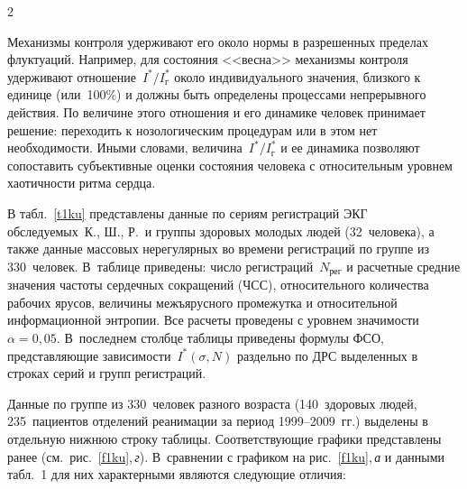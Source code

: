 \begin{multicols}{2}
Механизмы контроля удерживают его 
около нормы в разрешенных пределах флуктуаций. Например, для состояния 
<<весна>> механизмы контроля удерживают отношение~$I^*/I_{\mathrm{г}}^*$ 
около индивидуального значения, близкого к единице (или~100\%) и должны 
быть определены процессами непрерывного действия. По величине этого 
отношения и его динамике человек принимает решение: переходить к 
нозологическим процедурам или в этом нет необходимости. Иными словами, 
величина~$I^*/I_{\mathrm{г}}^*$ и ее динамика позволяют сопоставить 
субъективные оценки состояния человека с относительным уровнем 
хаотичности ритма сердца.
  
  В табл.~\ref{t1ku} представлены данные по сериям регистраций ЭКГ 
обследуемых~К., Ш., Р.\ и группы здоровых молодых людей (32~человека), а 
также данные массовых нерегулярных во времени ре\-гист\-ра\-ций по группе из 
330~человек. В~таблице приведены: число регистраций~$N_{\mathrm{рег}}$ и 
расчетные средние значения частоты сердечных сокращений (ЧСС), 
относительного количества рабочих ярусов, величины межъярусного 
промежутка и относительной информационной энтропии. Все расчеты 
проведены с уровнем значимости $\alpha = 0{,}05$. В~последнем столбце 
таблицы приведены формулы ФСО, представляющие зависимости~$I^*(\sigma, 
N)$ раздельно по ДРС выделенных в строках серий и групп ре\-гист\-раций. 
  


  
  Данные по группе из 330~человек разного воз\-рас\-та (140~здоровых людей, 
235~пациентов отделений реанимации за период 1999--2009~гг.) выделены в 
отдельную нижнюю строку таблицы. Соответствующие графики представлены 
ранее (см.\ рис.~\ref{f1ku},\,\textit{г}). В~сравнении с графиком на 
рис.~\ref{f1ku},\,\textit{а} и данными табл.~1 для них характерными являются 
следующие отличия: 


\end{multicols}
